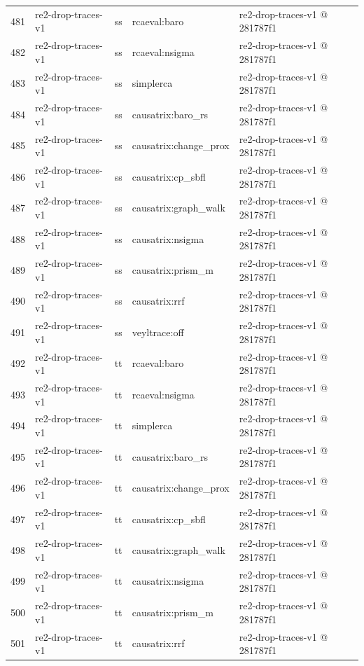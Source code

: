 \begin{longtable}{@{}r>{\raggedright\arraybackslash}p{87.0pt}>{\raggedright\arraybackslash}p{18.0pt}>{\raggedright\arraybackslash}p{63.0pt}>{\raggedright\arraybackslash}p{108.0pt}@{}}
481 & re2-drop-traces-v1 & ss & rcaeval:baro & re2-drop-traces-v1 @ 281787f1 \\
482 & re2-drop-traces-v1 & ss & rcaeval:nsigma & re2-drop-traces-v1 @ 281787f1 \\
483 & re2-drop-traces-v1 & ss & simplerca & re2-drop-traces-v1 @ 281787f1 \\
484 & re2-drop-traces-v1 & ss & causatrix:baro\_rs & re2-drop-traces-v1 @ 281787f1 \\
485 & re2-drop-traces-v1 & ss & causatrix:change\_prox & re2-drop-traces-v1 @ 281787f1 \\
486 & re2-drop-traces-v1 & ss & causatrix:cp\_sbfl & re2-drop-traces-v1 @ 281787f1 \\
487 & re2-drop-traces-v1 & ss & causatrix:graph\_walk & re2-drop-traces-v1 @ 281787f1 \\
488 & re2-drop-traces-v1 & ss & causatrix:nsigma & re2-drop-traces-v1 @ 281787f1 \\
489 & re2-drop-traces-v1 & ss & causatrix:prism\_m & re2-drop-traces-v1 @ 281787f1 \\
490 & re2-drop-traces-v1 & ss & causatrix:rrf & re2-drop-traces-v1 @ 281787f1 \\
491 & re2-drop-traces-v1 & ss & veyltrace:off & re2-drop-traces-v1 @ 281787f1 \\
492 & re2-drop-traces-v1 & tt & rcaeval:baro & re2-drop-traces-v1 @ 281787f1 \\
493 & re2-drop-traces-v1 & tt & rcaeval:nsigma & re2-drop-traces-v1 @ 281787f1 \\
494 & re2-drop-traces-v1 & tt & simplerca & re2-drop-traces-v1 @ 281787f1 \\
495 & re2-drop-traces-v1 & tt & causatrix:baro\_rs & re2-drop-traces-v1 @ 281787f1 \\
496 & re2-drop-traces-v1 & tt & causatrix:change\_prox & re2-drop-traces-v1 @ 281787f1 \\
497 & re2-drop-traces-v1 & tt & causatrix:cp\_sbfl & re2-drop-traces-v1 @ 281787f1 \\
498 & re2-drop-traces-v1 & tt & causatrix:graph\_walk & re2-drop-traces-v1 @ 281787f1 \\
499 & re2-drop-traces-v1 & tt & causatrix:nsigma & re2-drop-traces-v1 @ 281787f1 \\
500 & re2-drop-traces-v1 & tt & causatrix:prism\_m & re2-drop-traces-v1 @ 281787f1 \\
501 & re2-drop-traces-v1 & tt & causatrix:rrf & re2-drop-traces-v1 @ 281787f1 \\

\end{longtable}
